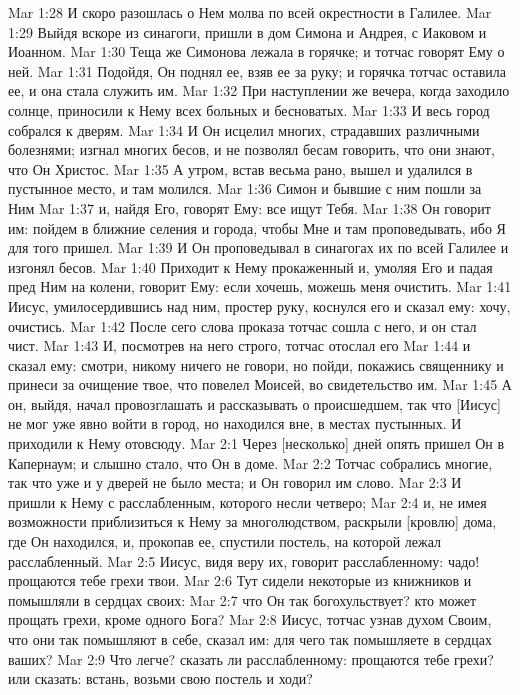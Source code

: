 Mar 1:28  И скоро разошлась о Нем молва по всей окрестности в Галилее.
Mar 1:29  Выйдя вскоре из синагоги, пришли в дом Симона и Андрея, с Иаковом и Иоанном.
Mar 1:30  Теща же Симонова лежала в горячке; и тотчас говорят Ему о ней.
Mar 1:31  Подойдя, Он поднял ее, взяв ее за руку; и горячка тотчас оставила ее, и она стала служить им.
Mar 1:32  При наступлении же вечера, когда заходило солнце, приносили к Нему всех больных и бесноватых.
Mar 1:33  И весь город собрался к дверям.
Mar 1:34  И Он исцелил многих, страдавших различными болезнями; изгнал многих бесов, и не позволял бесам говорить, что они знают, что Он Христос.
Mar 1:35  А утром, встав весьма рано, вышел и удалился в пустынное место, и там молился.
Mar 1:36  Симон и бывшие с ним пошли за Ним
Mar 1:37  и, найдя Его, говорят Ему: все ищут Тебя.
Mar 1:38  Он говорит им: пойдем в ближние селения и города, чтобы Мне и там проповедывать, ибо Я для того пришел.
Mar 1:39  И Он проповедывал в синагогах их по всей Галилее и изгонял бесов.
Mar 1:40  Приходит к Нему прокаженный и, умоляя Его и падая пред Ним на колени, говорит Ему: если хочешь, можешь меня очистить.
Mar 1:41  Иисус, умилосердившись над ним, простер руку, коснулся его и сказал ему: хочу, очистись.
Mar 1:42  После сего слова проказа тотчас сошла с него, и он стал чист.
Mar 1:43  И, посмотрев на него строго, тотчас отослал его
Mar 1:44  и сказал ему: смотри, никому ничего не говори, но пойди, покажись священнику и принеси за очищение твое, что повелел Моисей, во свидетельство им.
Mar 1:45  А он, выйдя, начал провозглашать и рассказывать о происшедшем, так что [Иисус] не мог уже явно войти в город, но находился вне, в местах пустынных. И приходили к Нему отовсюду.
Mar 2:1  Через [несколько] дней опять пришел Он в Капернаум; и слышно стало, что Он в доме.
Mar 2:2  Тотчас собрались многие, так что уже и у дверей не было места; и Он говорил им слово.
Mar 2:3  И пришли к Нему с расслабленным, которого несли четверо;
Mar 2:4  и, не имея возможности приблизиться к Нему за многолюдством, раскрыли [кровлю] дома, где Он находился, и, прокопав ее, спустили постель, на которой лежал расслабленный.
Mar 2:5  Иисус, видя веру их, говорит расслабленному: чадо! прощаются тебе грехи твои.
Mar 2:6  Тут сидели некоторые из книжников и помышляли в сердцах своих:
Mar 2:7  что Он так богохульствует? кто может прощать грехи, кроме одного Бога?
Mar 2:8  Иисус, тотчас узнав духом Своим, что они так помышляют в себе, сказал им: для чего так помышляете в сердцах ваших?
Mar 2:9  Что легче? сказать ли расслабленному: прощаются тебе грехи? или сказать: встань, возьми свою постель и ходи?
